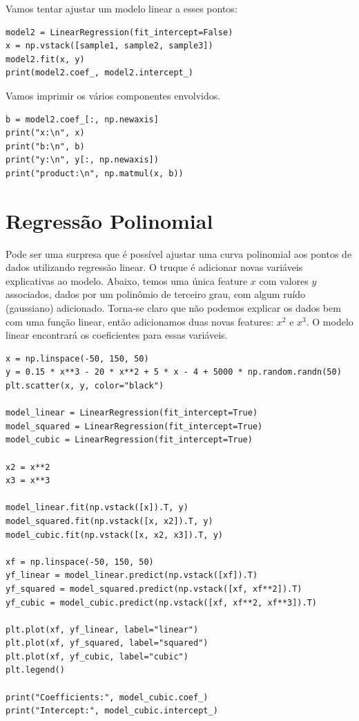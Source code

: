 \documentclass[11pt,a4paper]{article}
\begin{document}
Vamos tentar ajustar um modelo linear a esses pontos:
\begin{lstlisting}
model2 = LinearRegression(fit_intercept=False)
x = np.vstack([sample1, sample2, sample3])
model2.fit(x, y)
print(model2.coef_, model2.intercept_)
\end{lstlisting}

Vamos imprimir os vários componentes envolvidos.
\begin{lstlisting}
b = model2.coef_[:, np.newaxis]
print("x:\n", x)
print("b:\n", b)
print("y:\n", y[:, np.newaxis])
print("product:\n", np.matmul(x, b))
\end{lstlisting}

\section{Regressão Polinomial}

Pode ser uma surpresa que é possível ajustar uma curva polinomial aos pontos de dados utilizando regressão linear. O truque é adicionar novas variáveis explicativas ao modelo. Abaixo, temos uma única feature $x$ com valores $y$ associados, dados por um polinômio de terceiro grau, com algum ruído (gaussiano) adicionado. Torna-se claro que não podemos explicar os dados bem com uma função linear, então adicionamos duas novas features: $x^2$ e $x^3$. O modelo linear encontrará os coeficientes para essas variáveis.

\begin{lstlisting}
x = np.linspace(-50, 150, 50)
y = 0.15 * x**3 - 20 * x**2 + 5 * x - 4 + 5000 * np.random.randn(50)
plt.scatter(x, y, color="black")

model_linear = LinearRegression(fit_intercept=True)
model_squared = LinearRegression(fit_intercept=True)
model_cubic = LinearRegression(fit_intercept=True)

x2 = x**2
x3 = x**3

model_linear.fit(np.vstack([x]).T, y)
model_squared.fit(np.vstack([x, x2]).T, y)
model_cubic.fit(np.vstack([x, x2, x3]).T, y)

xf = np.linspace(-50, 150, 50)
yf_linear = model_linear.predict(np.vstack([xf]).T)
yf_squared = model_squared.predict(np.vstack([xf, xf**2]).T)
yf_cubic = model_cubic.predict(np.vstack([xf, xf**2, xf**3]).T)

plt.plot(xf, yf_linear, label="linear")
plt.plot(xf, yf_squared, label="squared")
plt.plot(xf, yf_cubic, label="cubic")
plt.legend()

print("Coefficients:", model_cubic.coef_)
print("Intercept:", model_cubic.intercept_)
\end{lstlisting}
\end{document}
